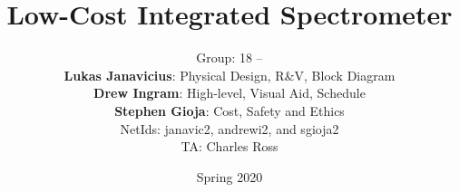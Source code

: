 
\newcommand{\assignmentname}{ASSIGNMENT}
\newcommand{\HRule}[1]{\rule{\linewidth}{#1}}

\makeatletter

\renewcommand{\maketitle}{
\begin{titlepage}
\begin{center}
\textbf{\LARGE{ \huge \\ [4.0cm] \@title \\[0.3cm] \assignmentname}}
\HRule{2pt}
\LARGE{\textit{ \@author \\ [3.0cm]}
ECE 445 -- Spring 2020}
\end{center}
\end{titlepage}
}\makeatother






\title{Low-Cost Integrated Spectrometer}
\date{ Spring 2020 } %
\author{
Group: 18 --\\ \textbf{Lukas Janavicius}: Physical Design, R\&V, Block Diagram \\ \textbf{Drew Ingram}: High-level, Visual Aid, Schedule\\ \textbf{Stephen Gioja}: Cost, Safety and Ethics \\[2.0cm]
NetIds: janavic2, andrewi2, and sgioja2\\
TA: Charles Ross
}


